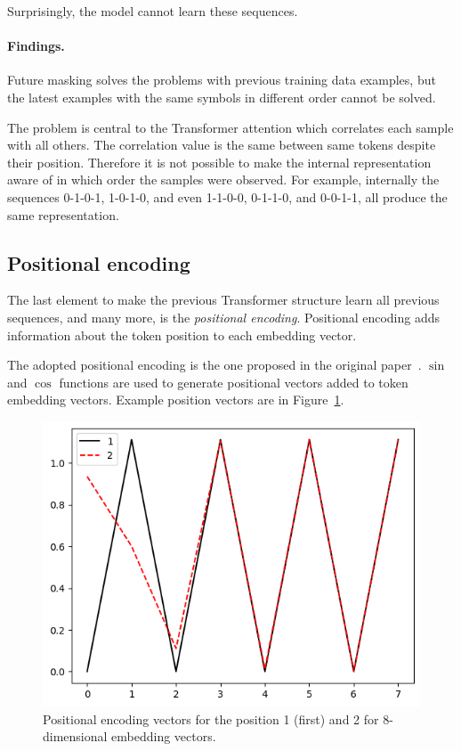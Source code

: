 \documentclass[final]{article}
\begin{document}
Surprisingly, the model cannot learn these sequences.

\paragraph{Findings.}
Future masking solves the problems with previous training data examples, but the latest examples with the same symbols in different order cannot be solved.

The problem is central to the Transformer attention which correlates each sample with all others. The correlation value is the same between same tokens despite their position. Therefore it is not possible to make the internal representation aware of in which order the samples were observed. For example, internally the sequences 0-1-0-1, 1-0-1-0, and even 1-1-0-0, 0-1-1-0, and 0-0-1-1, all produce the same representation.


\subsection{Positional encoding}
The last element to make the previous Transformer structure learn all previous sequences, and many more, is the \textit{positional encoding}. Positional encoding adds information about the token position to each embedding vector.

The adopted positional encoding is the one proposed in the original paper~\cite{transformer}. $\sin$ and $\cos$ functions are used to generate positional vectors added to token embedding vectors. Example position vectors are in Figure~\ref{fig:posencoding}.

\begin{figure}[h]
  \begin{center}
  \includegraphics[width=0.5\linewidth]{posencoding.png}
  \caption{Positional encoding vectors for the position 1 (first) and 2 for 8-dimensional embedding vectors.}
  \label{fig:posencoding}
  \end{center}
\end{figure}
\end{document}
